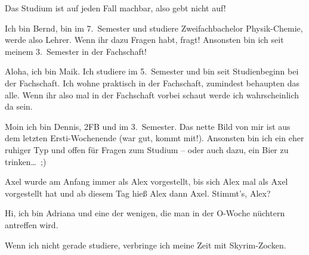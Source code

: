 \begin{multicols*}{2}
{Das Studium ist auf jeden Fall machbar, also gebt nicht auf!}

{Ich bin Bernd, bin im 7.\ Semester und studiere Zweifachbachelor Physik-Chemie, werde also Lehrer. Wenn ihr dazu Fragen habt, fragt! Ansonsten bin ich seit meinem 3.\ Semester in der Fachschaft!
\vspace{2\baselineskip}}

{Aloha, ich bin Maik. Ich studiere im 5.\ Semester und bin seit Studienbeginn bei der Fachschaft. Ich wohne praktisch in der Fachschaft, zumindest behaupten das alle. Wenn ihr also mal in der Fachschaft vorbei schaut werde ich wahrscheinlich da sein.}

{Moin ich bin Dennis, 2FB und im 3.\ Semester. Das nette Bild von mir ist aus dem letzten Ersti-Wochenende (war gut, kommt mit!). Ansonsten bin ich ein eher ruhiger Typ und offen für Fragen zum Studium -- oder auch dazu, ein Bier zu trinken\dots\  ;)}


{Axel wurde am Anfang immer als Alex vorgestellt, bis sich Alex mal als Axel vorgestellt hat und ab diesem Tag hieß Alex dann Axel. Stimmt's, Alex?
\vspace{2\baselineskip}}

{Hi, ich bin Adriana und eine der wenigen, die man in der O-Woche nüchtern antreffen wird.

Wenn ich nicht gerade studiere, verbringe ich meine Zeit mit Skyrim-Zocken.
\vspace{2\baselineskip}}


\end{multicols*}
